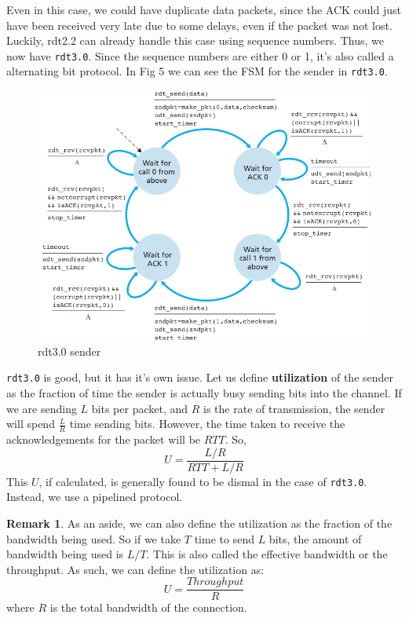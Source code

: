\documentclass[12pt,letterpaper]{amsbook}
\theoremstyle{definition}
\newtheorem*{remark}{Remark}
\begin{document}
Even in this case, we could have duplicate data packets, since the ACK could just have been received very late due to some delays, even if the packet was not lost. Luckily, rdt2.2 can already handle this case using sequence numbers. Thus, we now have \texttt{rdt3.0}. Since the sequence numbers are either 0 or 1, it's also called a alternating bit protocol. In Fig 5 we can see the FSM for the sender in \texttt{rdt3.0}.

\begin{figure}[htpb]
  \centering
  \includegraphics[width=0.8\linewidth]{./assets/rdt3_fsm.png}
  \caption{rdt3.0 sender}%
  \label{fig:./assets}
\end{figure}

\texttt{rdt3.0} is good, but it has it's own issue. Let us define \textbf{utilization} of the sender as the fraction of time the sender is actually busy sending bits into the channel. If we are sending $L$ bits per packet, and $R$ is the rate of transmission, the sender will spend $\frac{L}{R}$ time sending bits. However, the time taken to receive the acknowledgements for the packet will be $RTT$. So,
\[U = \frac{L/R}{RTT+L/R}\]
This $U$, if calculated, is generally found to be dismal in the case of \texttt{rdt3.0}. Instead, we use a pipelined protocol.

\begin{remark}
  As an aside, we can also define the utilization as the fraction of the bandwidth being used. So if we take $T$ time to send $L$ bits, the amount of bandwidth being used is $L/T$. This is also called the effective bandwidth or the throughput. As such, we can define the utilization as:
\[U = \frac{Throughput}{R}\]
where $R$ is the total bandwidth of the connection.
\end{remark}
\end{document}
